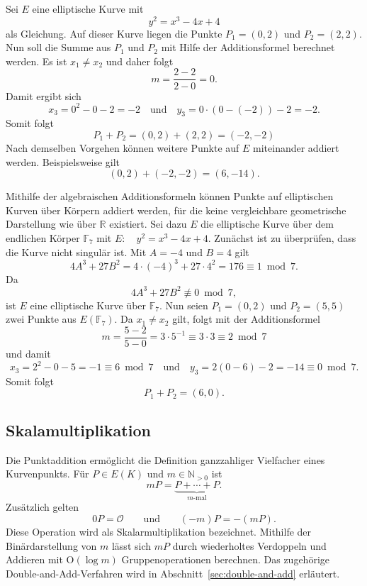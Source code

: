 \begin{beispiel}
    Sei $E$ eine elliptische Kurve mit
    \[
        y^2=x^3-4x+4
    \]
    als Gleichung. Auf dieser Kurve liegen die Punkte $P_1=(0,2)$ und $P_2=(2,2)$. Nun soll die Summe aus $P_1$ und $P_2$ mit Hilfe der Additionsformel berechnet werden. Es ist $x_1\neq x_2$ und daher folgt
    \[
        m = \frac{2-2}{2-0}=0.
    \]
    Damit ergibt sich
    \[
        x_3 = 0^2-0-2=-2 \quad \text{und} \quad y_3 = 0\cdot(0-(-2))-2 =-2.
    \]
    Somit folgt
    \[
        P_1+P_2=(0,2)+(2,2)= (-2,-2)
    \]
    Nach demselben Vorgehen können weitere Punkte auf $E$ miteinander addiert werden. Beispielsweise gilt
    \[
        (0,2)+(-2,-2)=(6,-14).
    \]
\end{beispiel}

\begin{beispiel}
    Mithilfe der algebraischen Additionsformeln können Punkte auf elliptischen Kurven über Körpern addiert werden, für die keine vergleichbare geometrische Darstellung wie über $\mathbb{R}$ existiert. Sei dazu $E$ die elliptische Kurve über dem endlichen Körper $\mathbb{F}_7$ mit \(E: \quad y^2=x^3-4x+4\). Zunächst ist zu überprüfen, dass die Kurve nicht singulär ist. Mit $A=-4$ und $B=4$ gilt
    \[
        4A^3+27B^2
        =
        4\cdot{(-4)}^3+27\cdot4^2
        =
        176
        \equiv1\bmod 7.
    \]
    Da
    \[
        4A^3+27B^2\not\equiv0\bmod7,
    \]
    ist $E$ eine elliptische Kurve über $\mathbb{F}_7$.
    Nun seien \(P_1=(0,2)\text{ und }P_2=(5,5)\) zwei Punkte aus $E(\mathbb{F}_7)$. Da $x_1\neq x_2$ gilt, folgt mit der Additionsformel
    \[
        m=\frac{5-2}{5-0}= 3\cdot 5^{-1}\equiv 3\cdot 3 \equiv 2 \bmod 7
    \]
    und damit
    \[
        x_3=2^2-0-5=-1\equiv 6 \bmod 7\quad \text{und}\quad  y_3=2(0-6)-2=-14 \equiv 0\bmod 7.
    \]
    Somit folgt
    \[
        P_1+P_2=(6,0).
    \]
\end{beispiel}

\subsection{Skalamultiplikation}
Die Punktaddition ermöglicht die Definition ganzzahliger Vielfacher eines Kurvenpunkts. Für $P\in E(K)$ und
$m\in\mathbb{N}_{>0}$ ist
\[
    mP=\underbrace{P+\cdots+P}_{m\text{-mal}}.
\]
Zusätzlich gelten
\[
    0P=\mathcal{O}
    \qquad\text{und}\qquad
    (-m)P=-(mP).
\]
Diese Operation wird als Skalarmultiplikation bezeichnet. Mithilfe der Binärdarstellung von $m$ lässt sich $mP$ durch wiederholtes Verdoppeln und Addieren mit $\mathrm{O}(\log m)$ Gruppenoperationen berechnen. Das zugehörige Double-and-Add-Verfahren wird in Abschnitt~\ref{sec:double-and-add} erläutert.

